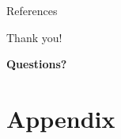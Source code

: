 \documentclass[aspectratio=169]{beamer}
\begin{document}
\begin{frame}[allowframebreaks]{References}
  
  
\end{frame}

\begin{frame}
  \begin{center}
    \Large Thank you!
  \end{center}

  \vspace{0.3cm}

  \begin{center}
    \textbf{Questions?}
  \end{center}
\end{frame}

\section*{Appendix}
\end{document}

